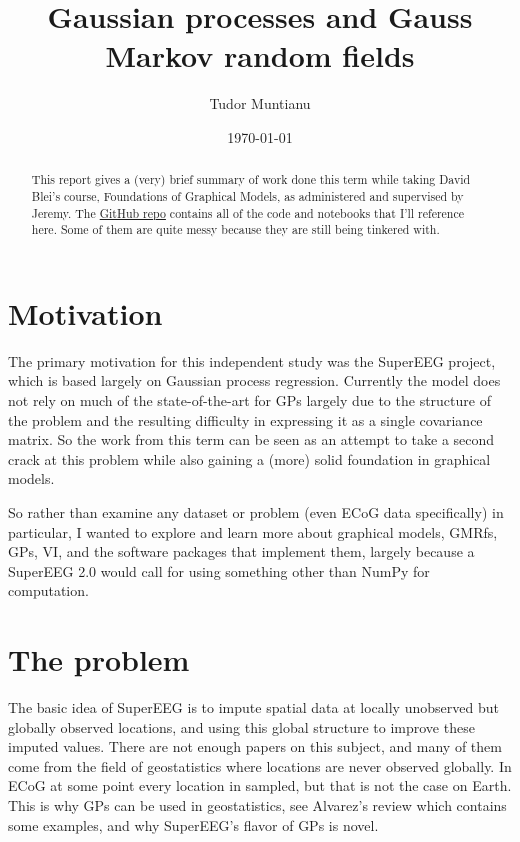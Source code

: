 \documentclass{article}
\begin{document}
\title{Gaussian processes and Gauss Markov random fields}
\date{\today}
\author{Tudor Muntianu}
\maketitle

\begin{abstract}
This report gives a (very) brief summary of work done this term while taking David
Blei's course, Foundations of Graphical Models, as administered and supervised
by Jeremy. The \href{https://github.com/tmuntianu/gmrfs}{GitHub repo} contains
all of the code and notebooks that I'll reference here. Some of them are quite
messy because they are still being tinkered with.
\end{abstract}

\section{Motivation}
The primary motivation for this independent study was the SuperEEG project, which
is based largely on Gaussian process regression. Currently the model does not
rely on much of the state-of-the-art for GPs largely due to the structure of
the problem and the resulting difficulty in expressing it as a single covariance
matrix. So the work from this term can be seen as an attempt to take a second
crack at this problem while also gaining a (more) solid foundation in graphical
models.

So rather than examine any dataset or problem (even ECoG data specifically)
in particular, I wanted to explore and learn more about graphical models, GMRfs, GPs, VI, and the
software packages that implement them, largely because a SuperEEG 2.0 would
call for using something other than NumPy for computation.

\section{The problem}
The basic idea of SuperEEG is to impute spatial data at locally unobserved
but globally observed locations, and using this global structure to improve these
imputed values. There are not enough papers on this subject, and many of them
come from the field of geostatistics where locations are never observed globally.
In ECoG at some point every location in sampled, but that is not the case on Earth.
This is why GPs can be used in geostatistics, see Alvarez's review\cite{alvarez2012kernels} which contains some examples,
and why SuperEEG's flavor of GPs is novel.
\end{document}
